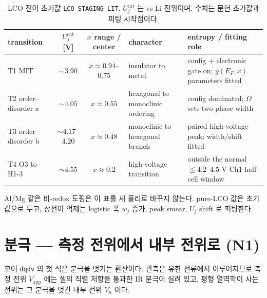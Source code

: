 \documentclass[11pt,a4paper]{article}
\newcommand{\app}{\mathrm{app}}
\newcommand{\code}[1]{\texttt{#1}}
\begin{document}
\begin{table}[t]
\centering\footnotesize
\renewcommand{\arraystretch}{1.18}
\caption{LCO 전이 초기값 \code{LCO\_STAGING\_LIT}. $U_j^\mathrm{cat}$ 는 vs Li 전위이며, 수치는 문헌 초기값과 피팅 시작점이다.}
\label{tab:lco_staging}
\begin{tabular}{l c c p{} p{}}
\toprule
transition & $U_j^\mathrm{cat}$ [V] & $x$ range / center & character & entropy / fitting role \\
\midrule
T1 MIT & $\sim3.90$ & $x\approx0.94$--$0.75$ & insulator to metal & config $+$ electronic gate on; $g(E_F,x)$ parameters fitted \\
T2 order--disorder a & $\sim4.05$ & $x\approx0.55$ & hexagonal to monoclinic ordering & config dominated; $\Omega$ sets two-phase width \\
T3 order--disorder b & $\sim4.17$--$4.20$ & $x\approx0.48$ & monoclinic to hexagonal branch & paired high-voltage peak; width/shift fitted \\
T4 O3 to H1-3 & $\sim4.55$ & $x\approx0.2$ & high-voltage transition & outside the normal $\le4.2$--$4.5$ V Ch1 half-cell window \\
\bottomrule
\end{tabular}
\end{table}

Al/Mg 같은 비-redox 도핑은 이 표를 새 물리로 바꾸지 않는다. pure-LCO 값은 초기값으로 두고, 상전이 억제는 logistic 폭
$w_j$ 증가, peak smear, $U_j$ shift 로 피팅한다.

\section{분극 — 측정 전위에서 내부 전위로 (N1)}\label{sec:pol}
코어 \code{dqdv} 의 첫 식은 분극을 벗기는 환산이다. 관측은 유한 전류에서 이루어지므로 측정 전위 $V_\app$ 에는 셀의
직렬 저항을 통과한 IR 분극이 실려 있고, 평형 열역학이 사는 전위는 그 분극을 벗긴 내부 전위 $V_n$ 이다.
\end{document}
